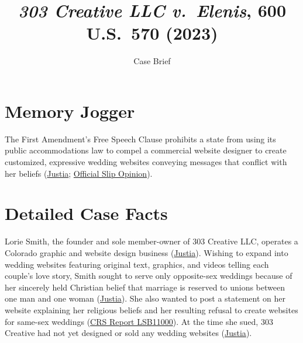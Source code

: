 \documentclass[12pt]{article}
\title{\textit{303 Creative LLC v.\ Elenis}, 600 U.S.\ 570 (2023)}
\subtitle{Case Brief}
\author{}
\date{}
\begin{document}
\maketitle

\section{Memory Jogger}
The First Amendment's Free Speech Clause prohibits a state from using its public accommodations law to compel a commercial website designer to create customized, expressive wedding websites conveying messages that conflict with her beliefs (\href{https://supreme.justia.com/cases/federal/us/600/21-476/}{Justia}; \href{https://www.supremecourt.gov/opinions/22pdf/21-476_c185.pdf}{Official Slip Opinion}).

\section{Detailed Case Facts}
Lorie Smith, the founder and sole member-owner of 303 Creative LLC, operates a Colorado graphic and website design business (\href{https://supreme.justia.com/cases/federal/us/600/21-476/}{Justia}). Wishing to expand into wedding websites featuring original text, graphics, and videos telling each couple's love story, Smith sought to serve only opposite-sex weddings because of her sincerely held Christian belief that marriage is reserved to unions between one man and one woman (\href{https://supreme.justia.com/cases/federal/us/600/21-476/}{Justia}). She also wanted to post a statement on her website explaining her religious beliefs and her resulting refusal to create websites for same-sex weddings (\href{https://www.everycrsreport.com/reports/LSB11000.html}{CRS Report LSB11000}). At the time she sued, 303 Creative had not yet designed or sold any wedding websites (\href{https://supreme.justia.com/cases/federal/us/600/21-476/}{Justia}).
\end{document}
